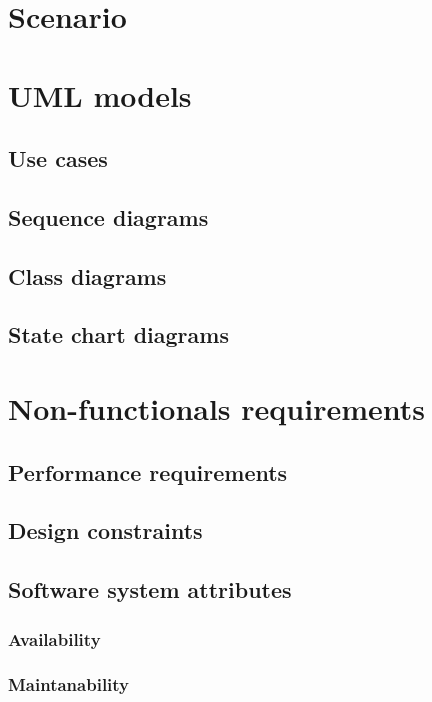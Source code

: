 \section{Scenario}

\section{UML models}

\subsection{Use cases}

\subsection{Sequence diagrams}

\subsection{Class diagrams}

\subsection{State chart diagrams}

\section{Non-functionals requirements}

\subsection{Performance requirements}

\subsection{Design constraints}

\subsection{Software system attributes}

\subsubsection{Availability}

\subsubsection{Maintanability}

